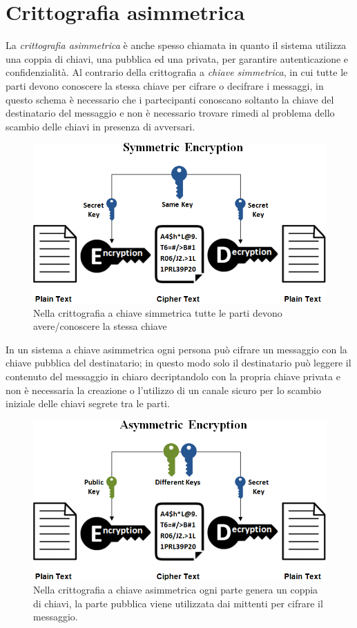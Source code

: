 \section{Crittografia asimmetrica}
La \textit{crittografia asimmetrica} è anche spesso chiamata  in quanto il sistema utilizza una coppia di chiavi, una pubblica ed una privata, per garantire autenticazione e confidenzialità.
Al contrario della crittografia a \textit{chiave simmetrica}, in cui tutte le parti devono conoscere la stessa chiave per cifrare o decifrare i messaggi, in questo schema è necessario che i partecipanti conoscano soltanto la chiave  del destinatario del messaggio e non è necessario trovare rimedi al problema dello scambio delle chiavi in presenza di avversari.
\begin{figure}[H]
    \centering
    \includegraphics[scale=0.6]{images/simmetric.png}
    \caption{Nella crittografia a chiave simmetrica tutte le parti devono avere/conoscere la stessa chiave}
\end{figure}

In un sistema a chiave asimmetrica ogni persona può cifrare un messaggio con la chiave pubblica del destinatario; in questo modo solo il destinatario può leggere il contenuto del messaggio in chiaro decriptandolo con la propria chiave privata e non è necessaria la creazione o l'utilizzo di un canale sicuro per lo scambio iniziale delle chiavi segrete tra le parti.

\begin{figure}
    \centering
    \includegraphics[scale=0.6]{images/asymmetric.png}
    \caption{Nella crittografia a chiave asimmetrica ogni parte genera un coppia di chiavi, la parte pubblica viene utilizzata dai mittenti per cifrare il messaggio.}
\end{figure}

